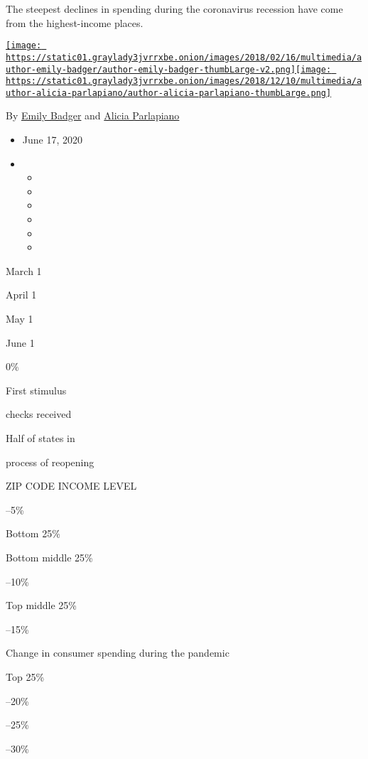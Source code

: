 The steepest declines in spending during the coronavirus recession have
come from the highest-income places.

\href{https://www.nytimes3xbfgragh.onion/by/emily-badger}{\texttt{[image: https://static01.graylady3jvrrxbe.onion/images/2018/02/16/multimedia/author-emily-badger/author-emily-badger-thumbLarge-v2.png]}}\href{https://www.nytimes3xbfgragh.onion/by/alicia-parlapiano}{\texttt{[image: https://static01.graylady3jvrrxbe.onion/images/2018/12/10/multimedia/author-alicia-parlapiano/author-alicia-parlapiano-thumbLarge.png]}}

By \href{https://www.nytimes3xbfgragh.onion/by/emily-badger}{Emily
Badger} and
\href{https://www.nytimes3xbfgragh.onion/by/alicia-parlapiano}{Alicia
Parlapiano}

\begin{itemize}
\item
  June 17, 2020
\item
  \begin{itemize}
  \item
  \item
  \item
  \item
  \item
  \item
  \end{itemize}
\end{itemize}

March 1

April 1

May 1

June 1

0\%

First stimulus

checks received

Half of states in

process of reopening

ZIP CODE INCOME LEVEL

--5\%

Bottom 25\%

Bottom middle 25\%

--10\%

Top middle 25\%

--15\%

Change in consumer spending during the pandemic

Top 25\%

--20\%

--25\%

--30\%

